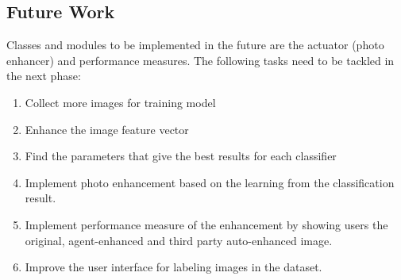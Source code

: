 \documentclass[11pt, a4paper]{article}
\begin{document}
\subsection{Future Work}
Classes and modules to be implemented in the future are the actuator (photo enhancer) and performance measures. The following tasks need to be tackled in the next phase:
\begin{enumerate}
 \item  Collect more images for training model 
 \item  Enhance the image feature vector
  \item Find the parameters that give the best results for each classifier
  \item Implement photo enhancement based on the learning from the classification result.
  \item Implement performance measure of the enhancement by showing users the original, agent-enhanced and third party auto-enhanced image.
  \item Improve the user interface for labeling images in the dataset.
\end{enumerate}


 

\end{document}
